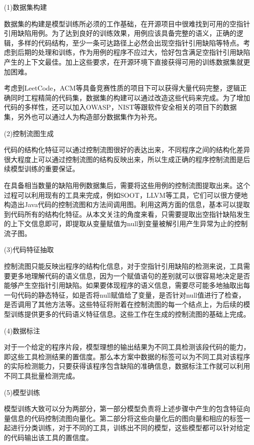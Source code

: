 (1)数据集构建

数据集的构建是模型训练所必须的工作基础，在开源项目中很难找到可用的空指针引用缺陷用例。为了达到良好的训练效果，用例应该具备完整的语义，正确的逻辑，多样的代码结构，至少一条可达路径上必然会出现空指针引用缺陷等特点。考虑到后期的处理和训练，作为用例的程序不应过大，恰好包含满足空指针引用缺陷产生的上下文最佳。加上这些要求，在开源环境下直接获得可用的训练数据集就更加困难。

考虑到LeetCode，ACM等具备竞赛性质的项目下可以获得大量代码完整，逻辑正确同时工程精简的代码集，数据集的构建可以通过改造这些代码来完成。为了增加代码的多样性，还可以加入OWASP\cite{owasp}，NIST\cite{nist}等跟软件安全相关的项目下的数据集，另外也可以通过人为构造部分数据集作为补充。

(2)控制流图生成

代码的结构化特征可以通过控制流图很好的表达出来，不同程序之间的结构化差异很大程度上可以通过控制流图的结构反映出来，所以生成正确的程序控制流图是后续模型训练的重要保证。

在具备相当数量的缺陷用例数据集后，需要将这些用例的控制流图提取出来。这个过程可以利用现有的工具来完成，例如SOOT，LLVM等工具，它们可以很方便地构造出Java代码的控制流图和方法间调用图。利用这两方面的信息，基本可以提取到代码所有的结构化特征。从本文关注的角度来看，只需要提取出空指针缺陷发生的上下文信息即可，即提取从变量赋值为null到变量被解引用产生异常为止的控制流子图。

(3)代码特征抽取

控制流图只能反映出程序的结构化信息，对于空指针引用缺陷的检测来说，工具需要更多地理解代码的语义信息，因为一个赋值语句的差别就可以很容易地决定是否能够产生空指针引用缺陷。如果要体现程序的语义信息，需要尽可能多地抽取出每一句代码的静态特征，如是否将null赋值给了变量，是否针对null值进行了检查，是否调用了其他方法等。这些特征将附着在控制流图的每一个结点上，为后续的模型训练提供更多的代码语义特征信息。这些工作在生成的控制流图的基础上完成。

(4)数据标注

对于一个给定的程序片段，模型理想的输出结果为不同工具检测该段代码的能力，即这些工具检测结果的置信度。那么本方案中数据的标签可以为不同工具对该程序的实际检测能力，只要获得该程序包含缺陷的准确信息，数据标注工作就可以利用不同工具批量检测完成。

(5)模型训练

模型训练大致可以分为两部分，第一部分模型负责将上述步骤中产生的包含特征向量信息的代码控制流图向量化。第二部分将这些向量化后的图向量和相应的标签一起进行分类训练，对于不同的工具，训练出不同的模型，这些模型都可以针对给定的代码输出该工具的置信度。

